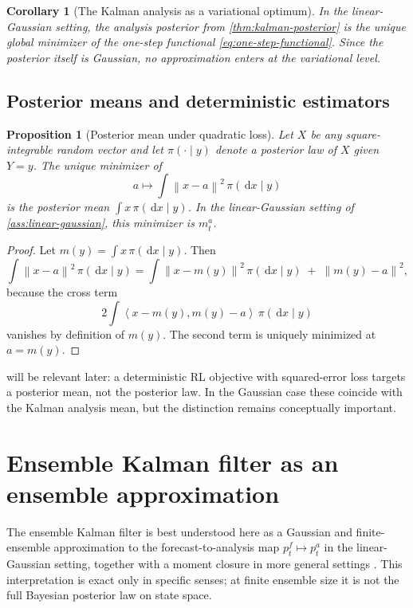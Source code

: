 \documentclass[11pt]{article}
\newcommand{\dd}{\,\mathrm d}
\newcommand{\norm}[1]{\left\lVert #1 \right\rVert}
\newcommand{\inner}[2]{\left\langle #1, #2 \right\rangle}
\numberwithin{equation}{section}
\theoremstyle{plain}
\newtheorem{proposition}[theorem]{Proposition}
\newtheorem{corollary}[theorem]{Corollary}
\theoremstyle{definition}
\theoremstyle{remark}
\begin{document}
\begin{corollary}[The Kalman analysis as a variational optimum]
\label{cor:kalman-variational}
In the linear-Gaussian setting, the analysis posterior from \cref{thm:kalman-posterior} is the unique global minimizer of the one-step functional \cref{eq:one-step-functional}. Since the posterior itself is Gaussian, no approximation enters at the variational level.
\end{corollary}

\subsection{Posterior means and deterministic estimators}

\begin{proposition}[Posterior mean under quadratic loss]
\label{prop:posterior-mean-quadratic}
Let $X$ be any square-integrable random vector and let $\pi(\cdot\mid y)$ denote a posterior law of $X$ given $Y=y$. The unique minimizer of
\[
a\mapsto \int \norm{x-a}^2\,\pi(\dd x\mid y)
\]
is the posterior mean $\int x\,\pi(\dd x\mid y)$. In the linear-Gaussian setting of \cref{ass:linear-gaussian}, this minimizer is $m_t^a$.
\end{proposition}

\begin{proof}
Let $m(y)=\int x\,\pi(\dd x\mid y)$. Then
\[
\int \norm{x-a}^2\,\pi(\dd x\mid y)
=
\int \norm{x-m(y)}^2\,\pi(\dd x\mid y)
\;+\;
\norm{m(y)-a}^2,
\]
because the cross term
\[
2\int \inner{x-m(y)}{m(y)-a}\,\pi(\dd x\mid y)
\]
vanishes by definition of $m(y)$. The second term is uniquely minimized at $a=m(y)$.
\end{proof}

 will be relevant later: a deterministic RL objective with squared-error loss targets a posterior mean, not the posterior law. In the Gaussian case these coincide with the Kalman analysis mean, but the distinction remains conceptually important.

\section{Ensemble Kalman filter as an ensemble approximation}
\label{sec:enkf}

The ensemble Kalman filter is best understood here as a Gaussian and finite-ensemble approximation to the forecast-to-analysis map $p_t^f\mapsto p_t^a$ in the linear-Gaussian setting, together with a moment closure in more general settings \citep{evensen2003,kelly2014}. This interpretation is exact only in specific senses; at finite ensemble size it is not the full Bayesian posterior law on state space.
\end{document}
